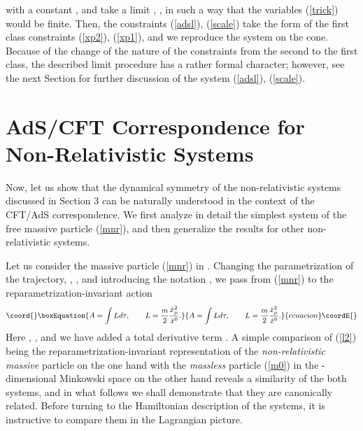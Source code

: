 \documentclass[a4paper,12pt]{article}
\def\R{\mathbb R}
\def\X{\mathfrak X}
\def\P{\mathfrak P}
\begin{document}
with a constant \coordHE{},
and take a limit \coordHE{},
\myHighlight{$\underline{\X}^A\rightarrow\infty$}\coordHE{},
\myHighlight{$\underline{\P}{}_A\rightarrow 0$}\coordHE{}
in such a way that the variables
(\ref{trick}) would be finite.
Then, the constraints
(\ref{adsl}), (\ref{scale}) take the form
of the first class constraints (\ref{xp2}), (\ref{xp1}),
and we reproduce the
system on the cone.
Because of the change of the nature
of the constraints from the second
to the first class,
the described limit procedure
has a rather formal character;
however, see the next Section for further discussion of
the system (\ref{adsl}), (\ref{scale}).


\section{AdS/CFT Correspondence for Non-Relativistic
Systems}


Now, let us show that the dynamical \coordHE{}
symmetry of the non-relativistic systems discussed in
Section 3
can be naturally understood in the context of the
CFT/AdS correspondence.
We first analyze in detail the simplest
system of the free massive particle
(\ref{mnr}), and then generalize the results
for other non-relativistic systems.

Let us consider the massive particle
(\ref{mnr}) in
\myHighlight{$\R^1$}\coordHE{}. Changing the parametrization
of the trajectory,
\coordHE{},
\coordHE{},
and introducing the notation \coordHE{},
we pass from (\ref{mnr}) to the
reparametrization-invariant action
\begin{equation}\coord{}\boxEquation{
A=\int Ld\tau,\qquad
L=\frac{m}{2}\frac{\dot{x}_\mu^2}{\dot{x}{}^0}.
\label{l2}
}{
A=\int Ld\tau,\qquad
L=\frac{m}{2}\frac{\dot{x}_\mu^2}{\dot{x}{}^0}.
}{ecuacion}\coordE{}\end{equation}
Here \coordHE{},
\coordHE{},
and we have added a
total derivative term
\coordHE{}.
A simple comparison of (\ref{l2})
being the reparametrization-invariant representation
of the {\it non-relativistic massive} particle
on the one hand
with the {\it massless} particle (\ref{m0})
in the \coordHE{}-dimensional
Minkowski space \myHighlight{$\R^{1,1}$}\coordHE{} on the other hand
reveals a
similarity of the both systems, and  in what follows we
shall
demonstrate that they are canonically related.
Before turning to the Hamiltonian description
of the systems, it is instructive to compare them
in the Lagrangian picture.
\end{document}
